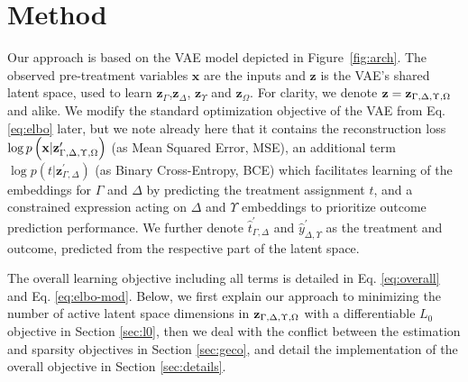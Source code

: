 \documentclass[doubleblind]{ecai}
\begin{document}
	\section{Method}
	\label{sec:method}
	
	Our approach is based on the VAE model depicted in Figure~\ref{fig:arch}. The observed pre-treatment variables $\mathbf{x}$ are the inputs and $\mathbf{z}$ is the VAE's shared latent space, used to learn $\mathbf{z}_{\Gamma}$,$\mathbf{z}_{\Delta}$, $\mathbf{z}_{\Upsilon}$ and $\mathbf{z}_{\Omega}$. For clarity, we denote $\mathbf{z} = \bold{z}_{\Gamma , \Delta , \Upsilon,\Omega}$ and alike.
	We modify the standard optimization objective of the VAE from Eq. \eqref{eq:elbo} later, but we note already here that it contains the reconstruction loss $\log p\left( \mathbf{x} | \bold{z}_{\Gamma , \Delta , \Upsilon,\Omega}^\prime \right)$ (as Mean Squared Error, MSE), an additional term $\log p(t | \mathbf{z}_{\Gamma,\Delta}^\prime)$ (as Binary Cross-Entropy, BCE) which facilitates learning of the embeddings for $\Gamma$ and $\Delta$ by predicting the treatment assignment $t$, and a constrained expression acting on $\Delta$ and $\Upsilon$ embeddings to prioritize outcome prediction performance.
	We further denote $\hat t_{\Gamma, \Delta}^\prime$ and $\hat y_{\Delta, \Upsilon}^\prime$ as the treatment and outcome, predicted from the respective part of the latent space.
	
	The overall learning objective including all terms is detailed in Eq. \eqref{eq:overall} and Eq. \eqref{eq:elbo-mod}.
	Below, we first explain our approach to minimizing the number of active latent space dimensions in $\bold{z}_{\Gamma , \Delta , \Upsilon,\Omega}$ with a differentiable $L_0$ objective in Section \ref{sec:l0}, then we deal with the conflict between the estimation and sparsity objectives in Section \ref{sec:geco}, and detail the implementation of the overall objective in Section \ref{sec:details}.
	
	
	
	
	
\end{document}
